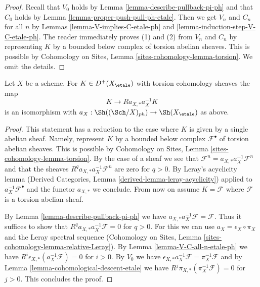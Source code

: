 \begin{proof}
Recall that $V_0$ holds by Lemma \ref{lemma-describe-pullback-pi-ph} and
that $C_0$ holds by Lemma \ref{lemma-proper-push-pull-ph-etale}.
Then we get $V_n$ and $C_n$ for all
$n$ by Lemmas \ref{lemma-V-implies-C-etale-ph} and
\ref{lemma-induction-step-V-C-etale-ph}.
The reader immediately proves (1) and (2) from $V_n$ and $C_n$
by representing $K$
by a bounded below complex of torsion abelian sheaves.
This is possible by Cohomology on Sites, Lemma
\ref{sites-cohomology-lemma-torsion}. We omit the details.
\end{proof}

\begin{lemma}
\label{lemma-cohomological-descent-etale-ph}
Let $X$ be a scheme. For $K \in D^+(X_\etale)$ with torsion cohomology
sheaves the map
$$
K \longrightarrow Ra_{X, *}a_X^{-1}K
$$
is an isomorphism with $a_X : \Sh((\Sch/X)_{ph}) \to \Sh(X_\etale)$ as above.
\end{lemma}

\begin{proof}
This statement has a reduction to the case where
$K$ is given by a single abelian sheaf. Namely, represent $K$
by a bounded below complex $\mathcal{F}^\bullet$ of torsion
abelian sheaves. This is possible by Cohomology on Sites, Lemma
\ref{sites-cohomology-lemma-torsion}. By the case of a
sheaf we see that
$\mathcal{F}^n = a_{X, *} a_X^{-1} \mathcal{F}^n$
and that the sheaves $R^qa_{X, *}a_X^{-1}\mathcal{F}^n$
are zero for $q > 0$. By Leray's acyclicity lemma
(Derived Categories, Lemma \ref{derived-lemma-leray-acyclicity})
applied to $a_X^{-1}\mathcal{F}^\bullet$
and the functor $a_{X, *}$ we conclude. From now on assume $K = \mathcal{F}$
where $\mathcal{F}$ is a torsion abelian sheaf.

\medskip\noindent
By Lemma \ref{lemma-describe-pullback-pi-ph} we have
$a_{X, *}a_X^{-1}\mathcal{F} = \mathcal{F}$. Thus it suffices to show that
$R^qa_{X, *}a_X^{-1}\mathcal{F} = 0$ for $q > 0$.
For this we can use $a_X = \epsilon_X \circ \pi_X$ and
the Leray spectral sequence
(Cohomology on Sites, Lemma \ref{sites-cohomology-lemma-relative-Leray}).
By Lemma \ref{lemma-V-C-all-n-etale-ph}
we have $R^i\epsilon_{X, *}(a_X^{-1}\mathcal{F}) = 0$ for $i > 0$.
By $V_0$ we have
$\epsilon_{X, *}a_X^{-1}\mathcal{F} = \pi_X^{-1}\mathcal{F}$
and by Lemma \ref{lemma-cohomological-descent-etale} we have
$R^j\pi_{X, *}(\pi_X^{-1}\mathcal{F}) = 0$ for $j > 0$.
This concludes the proof.
\end{proof}

